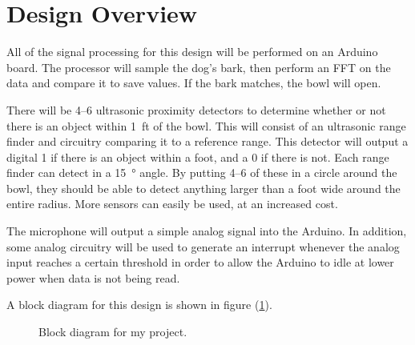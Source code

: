 \documentclass[12pt]{article}
\begin{document}
\section{Design Overview}
\label{sec:design_overview}

All of the signal processing for this design will be performed on an Arduino
board. The processor will sample the dog's bark, then perform an FFT on the data
and compare it to save values. If the bark matches, the bowl will open.

There will be 4--6 ultrasonic proximity detectors to determine whether or not
there is an object within \SI{1}{ft} of the bowl. This will consist of an
ultrasonic range finder and circuitry comparing it to a reference range. This
detector will output a digital 1 if there is an object within a foot, and a 0 if
there is not.  Each range finder can detect in a \SI{15}{\degree} angle. By
putting 4--6 of these in a circle around the bowl, they should be able to detect
anything larger than a foot wide around the entire radius. More sensors can
easily be used, at an increased cost.

The microphone will output a simple analog signal into the Arduino. In addition,
some analog circuitry will be used to generate an interrupt whenever the analog
input reaches a certain threshold in order to allow the Arduino to idle at lower
power when data is not being read.

A block diagram for this design is shown in figure (\ref{fig:diagram}).

\begin{figure}[h]
    \centering
    \caption{Block diagram for my project.}
\label{fig:diagram}
\end{figure}
\end{document}
